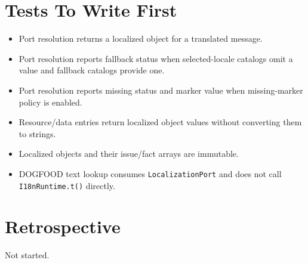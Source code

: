 \section{Tests To Write First}\label{record-195-tests-to-write-first}

\begin{itemize}
\tightlist
\item
  Port resolution returns a localized object for a translated message.
\item
  Port resolution reports fallback status when selected-locale catalogs omit a value and fallback catalogs provide one.
\item
  Port resolution reports missing status and marker value when missing-marker policy is enabled.
\item
  Resource/data entries return localized object values without converting them to strings.
\item
  Localized objects and their issue/fact arrays are immutable.
\item
  DOGFOOD text lookup consumes \texttt{L\allowbreak{}o\allowbreak{}c\allowbreak{}a\allowbreak{}l\allowbreak{}i\allowbreak{}z\allowbreak{}a\allowbreak{}t\allowbreak{}i\allowbreak{}o\allowbreak{}n\allowbreak{}P\allowbreak{}o\allowbreak{}r\allowbreak{}t} and does not call \texttt{I\allowbreak{}1\allowbreak{}8\allowbreak{}n\allowbreak{}R\allowbreak{}u\allowbreak{}n\allowbreak{}t\allowbreak{}i\allowbreak{}m\allowbreak{}e\allowbreak{}.\allowbreak{}t\allowbreak{}(\allowbreak{})} directly.
\end{itemize}

\section{Retrospective}\label{record-195-retrospective}

Not started.

